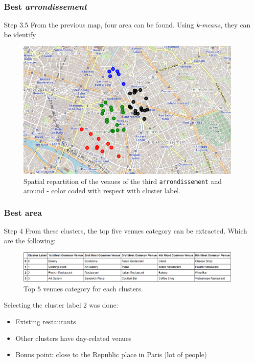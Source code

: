 \documentclass{beamer}
\begin{document}
\begin{frame}
	\frametitle{Best \textit{arrondissement}}
	\begin{block}{Step 3.5}
		From the previous map, four area can be found. Using \textit{k-means}, they can be identify
	\end{block}
	\begin{figure}[h!]
	\centering
	\includegraphics[width=0.60\linewidth,keepaspectratio]{Figures/FoliumClustered}
	\caption{Spatial repartition of the venues of the third \texttt{arrondissement} and around - color coded with respect with cluster label.}
	\label{FoliumMapColored}
	\end{figure}
\end{frame}

\begin{frame}
	\frametitle{Best area}
	\begin{block}{Step 4}
		From these clusters, the top five venues category can be extracted. Which are the following:
		\begin{figure}[h!]
			\centering
			\includegraphics[width=\linewidth,keepaspectratio]{Figures/TopFive}
			\caption{Top $5$ venues category for each clusters.}
			\label{ClustersVenueCat}
		\end{figure}
		Selecting the cluster label $2$ was done:
		\begin{itemize}
			\item Existing restaurants
			\item Other clusters have day-related venues
			\item Bonus point: close to the Republic place in Paris (lot of people)
		\end{itemize}
	\end{block}
\end{frame}
\end{document}
